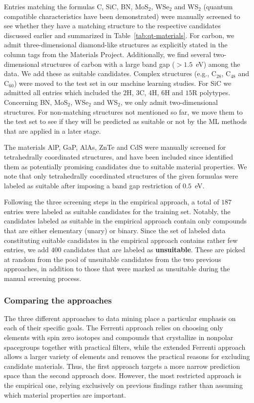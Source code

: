 \documentclass[superscriptaddress,unsortedaddress,
 amsmath,amssymb,
 aps,
]{revtex4-2}
\begin{document}
Entries matching the formulas C, SiC, BN, MoS$_2$, WSe$_2$ and WS$_2$ (quantum compatible characteristics have been demonstrated) were manually screened to see whether they have a matching structure to the respective candidates discussed earlier and summarized in Table~\ref{tab:qt-materials}. 
For carbon, we admit three-dimensional diamond-like structures as explicitly stated in the column tags from the Materials Project. Additionally, we find several two-dimensional structures of carbon with a large band gap ($>1.5$~eV) among the data. We add these as suitable candidates. Complex structures (e.g., C$_{28}$, C$_{48}$ and C$_{60}$) were moved to the test set in our machine learning studies. For SiC we admitted all entries which included the $2$H, $3$C, $4$H, $6$H and $15$R polytypes. Concerning BN, MoS$_2$, WSe$_2$ and WS$_2$, we only admit two-dimensional structures. For non-matching structures not mentioned so far, we move them to the test set to see if they will be predicted as suitable or not by the ML methods that are applied in a later stage.

The materials AlP, GaP, AlAs, ZnTe and CdS were manually screened for tetrahedrally coordinated structures, and have been included since \citeauthor{Weber2010} \cite{Weber2010} identified them as potentially promising candidates due to suitable material properties. 
We note that only tetrahedrally coordinated structures of the given formulas were labeled as suitable after imposing a band gap restriction of $0.5$~eV. 

Following the three screening steps in the empirical approach, a total of $187$ entries were labeled as suitable candidates for the training set. 
Notably, the candidates labeled as suitable in the empirical approach contain only compounds that are either elementary (unary) or binary. 
Since the set of labeled data constituting suitable candidates in the empirical approach contains rather few entries, we add $400$ candidates that are labeled as \textbf{unsuitable}. These are picked at random from the pool of unsuitable candidates from the two previous approaches, in addition to those that were marked as unsuitable during the manual screening process. 

\subsubsection*{Comparing the approaches}
The three different approaches to data mining place a particular emphasis on each of their specific goals. The Ferrenti approach relies on choosing only elements with spin zero isotopes and compounds that crystallize in nonpolar spacegroups together with practical filters, while the extended Ferrenti approach allows a larger variety of elements and removes the practical reasons for excluding candidate materials. Thus, the first approach targets a more narrow prediction space than the second approach does. However, the most restricted approach is the empirical one, relying exclusively on previous findings rather than assuming which material properties are important. 
\end{document}

